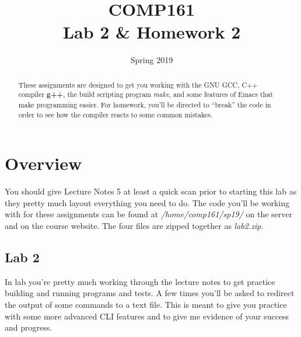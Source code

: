\documentclass[nobib]{tufte-handout}
\title{COMP161 \\ Lab 2 \& Homework 2}
\author{}
\date{Spring 2019}
\begin{document}
\maketitle

\begin{abstract}
These assignments are designed to get you working with the GNU GCC, C++ compiler \textbf{g++}, the build scripting program \textit{make}, and some features of Emacs that make programming easier. For homework, you'll be directed to ``break'' the code in order to see how the compiler reacts to some common mistakes.
\end{abstract}

\section{Overview}

You should give Lecture Notes 5 at least a quick scan prior to starting this lab as they pretty much layout everything you need to do. The code you'll be working with for these assignments can be found at \textit{/home/comp161/sp19/} on the server and on the course website. The four files are zipped together as \textit{lab2.zip}.

\subsection{Lab 2}

In lab you're pretty much working through the lecture notes to get practice building and running programs and tests.  A few times you'll be asked to redirect the output of some commands to a text file.  This is meant to give you practice with some more advanced CLI features and to give me evidence of your success and progress.
\end{document}
